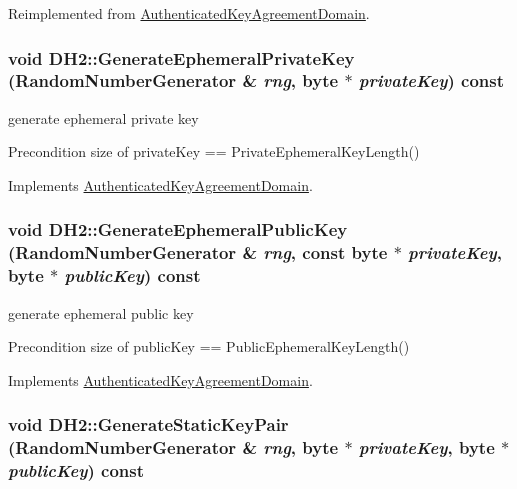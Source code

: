 Reimplemented from \hyperlink{class_authenticated_key_agreement_domain_aafe38894865a6f11c3282c8aa94df29e}{AuthenticatedKeyAgreementDomain}.\hypertarget{class_d_h2_ab0e10e700f4461005b386a53ca37e7f8}{
\subsubsection[{GenerateEphemeralPrivateKey}]{\setlength{\rightskip}{0pt plus 5cm}void DH2::GenerateEphemeralPrivateKey ({\bf RandomNumberGenerator} \& {\em rng}, \/  byte $\ast$ {\em privateKey}) const}}
\label{class_d_h2_ab0e10e700f4461005b386a53ca37e7f8}


generate ephemeral private key \begin{DoxyPrecond}{Precondition}
size of privateKey == PrivateEphemeralKeyLength() 
\end{DoxyPrecond}


Implements \hyperlink{class_authenticated_key_agreement_domain_ab6280d3bf8ad1dd2aa976910b81502f8}{AuthenticatedKeyAgreementDomain}.\hypertarget{class_d_h2_ab8f69e52f50794ca51774f671cfa45da}{
\subsubsection[{GenerateEphemeralPublicKey}]{\setlength{\rightskip}{0pt plus 5cm}void DH2::GenerateEphemeralPublicKey ({\bf RandomNumberGenerator} \& {\em rng}, \/  const byte $\ast$ {\em privateKey}, \/  byte $\ast$ {\em publicKey}) const}}
\label{class_d_h2_ab8f69e52f50794ca51774f671cfa45da}


generate ephemeral public key \begin{DoxyPrecond}{Precondition}
size of publicKey == PublicEphemeralKeyLength() 
\end{DoxyPrecond}


Implements \hyperlink{class_authenticated_key_agreement_domain_a9d1bc83a77f44af6616da42c33b3bc49}{AuthenticatedKeyAgreementDomain}.\hypertarget{class_d_h2_aa4a447f81fcdcc656fe4fc5b6e99dc2e}{
\subsubsection[{GenerateStaticKeyPair}]{\setlength{\rightskip}{0pt plus 5cm}void DH2::GenerateStaticKeyPair ({\bf RandomNumberGenerator} \& {\em rng}, \/  byte $\ast$ {\em privateKey}, \/  byte $\ast$ {\em publicKey}) const}}
\label{class_d_h2_aa4a447f81fcdcc656fe4fc5b6e99dc2e}


